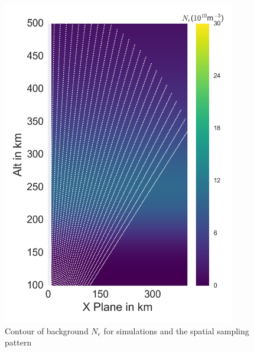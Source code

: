 \documentclass[draft,ras]{agutex}
\begin{document}
\begin{article}
\begin{figure}[!t]
\centering
\includegraphics[width=4in]{backgroundandsamp}
\caption{Contour of background $N_e$ for simulations and the spatial sampling pattern}
\label{fig:background1}
\end{figure}


\end{article}
\end{document}
